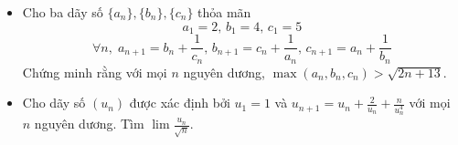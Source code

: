 \documentclass[11pt]{scrartcl}
\begin{document}
\begin{itemize}[label=, leftmargin=0em, itemsep=-0em]
\begin{btvn}
    \end{btvn}
    \item \begin{btvn}
    Cho ba dãy số $\{a_n\},\{b_n\},\{c_n\}$ thỏa mãn
    \[a_1=2,\,b_1=4,\,c_1=5\]
    \[\forall n,\; a_{n+1}=b_n+\frac{1}{c_n}, \, b_{n+1}=c_n+\frac{1}{a_n}, \, c_{n+1}=a_n+\frac{1}{b_n}\]
    Chứng minh rằng với mọi $n$ nguyên dương, $\max(a_n,b_n,c_n)>\sqrt{2n+13}$.
    \end{btvn}
    \item \begin{btvn}
        Cho dãy số $(u_n)$ được xác định bởi $u_1 = 1$ và $u_{n + 1} = u_n + \frac{2}{u_n} + \frac{n}{u_n^4}$ với mọi $n$ nguyên dương. Tìm $\lim \frac{u_n}{\sqrt{n}}$.
        

\end{btvn}
\end{itemize}
\end{document}
